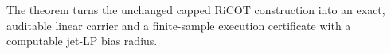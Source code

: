 The theorem turns the unchanged capped RiCOT construction into an exact, auditable linear carrier and a finite-sample execution certificate with a computable jet-LP bias radius.
